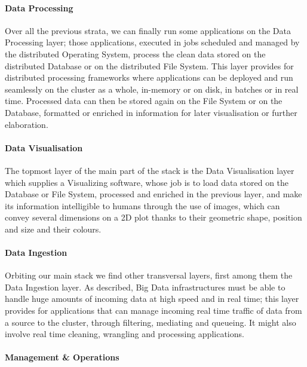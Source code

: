 \paragraph{Data Processing}

Over all the previous strata, we can finally run some applications on the Data Processing layer; those applications, executed in jobs scheduled and managed by the distributed Operating System, process the clean data stored on the distributed Database or on the distributed File System.\newline
This layer provides for distributed processing frameworks where applications can be deployed and run seamlessly on the cluster as a whole, in-memory or on disk, in batches or in real time.\newline
Processed data can then be stored again on the File System or on the Database, formatted or enriched in information for later visualisation or further elaboration.

\paragraph{Data Visualisation}

The topmost layer of the main part of the stack is the Data Visualisation layer which supplies a Visualizing software, whose job is to load data stored on the Database or File System, processed and enriched in the previous layer, and make its information intelligible to humans through the use of images, which can convey several dimensions on a 2D plot thanks to their geometric shape, position and size and their colours.

\paragraph{Data Ingestion}

Orbiting our main stack we find other transversal layers, first among them the Data Ingestion layer.\newline
As described, Big Data infrastructures must be able to handle huge amounts of incoming data at high speed and in real time; this layer provides for applications that can manage incoming real time traffic of data from a source to the cluster, through filtering, mediating and queueing. It might also involve real time cleaning, wrangling and processing applications.

\paragraph{Management \& Operations}

